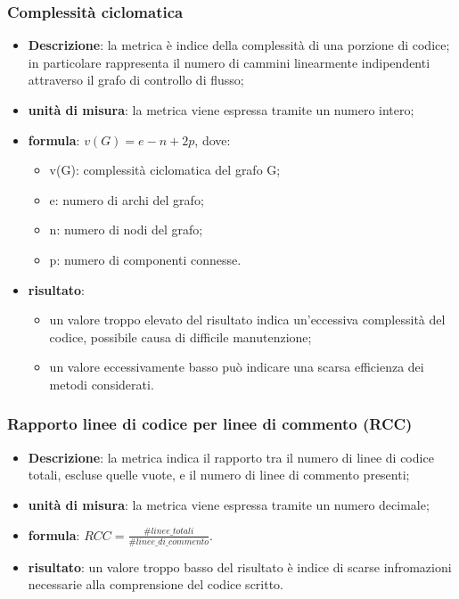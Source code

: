 	\subsubsection*{Complessità ciclomatica}
	\begin{itemize}
		\item{\textbf{Descrizione}}: la metrica è indice della complessità di una porzione di codice;  in particolare rappresenta il numero di cammini linearmente indipendenti attraverso il grafo di controllo di flusso; 
		\item{\textbf{unità di misura}}: la metrica viene espressa tramite un numero intero; 
		\item{\textbf{formula}}: $ v(G) = e - n + 2p $, dove: 
			\begin{itemize}
				\item{v(G)}: complessità ciclomatica del grafo G; 
				\item{e}: numero di archi del grafo; 
				\item{n}: numero di nodi del grafo; 
				\item{p}: numero di componenti connesse. 
			\end{itemize} 
		\item{\textbf{risultato}}:
			\begin{itemize}
				\item un valore troppo elevato del risultato indica un'eccessiva complessità del codice, possibile causa di difficile manutenzione; 
				\item un valore eccessivamente basso può indicare una scarsa efficienza dei metodi considerati. 
			\end{itemize} 
	\end{itemize}

	\subsubsection*{Rapporto linee di codice per linee di commento (RCC)}
	\begin{itemize}
		\item{\textbf{Descrizione}}: la metrica indica il rapporto tra il numero di linee di codice totali, escluse quelle vuote, e il numero di linee di commento presenti; 
		\item{\textbf{unità di misura}}: la metrica viene espressa tramite un numero decimale;  
		\item{\textbf{formula}}: $ RCC = \displaystyle\frac{\#linee\_totali}{\#linee\_di\_commento} $. 
		\item{\textbf{risultato}}: un valore troppo basso del risultato è indice di scarse infromazioni necessarie alla comprensione del codice scritto. 
	\end{itemize}

